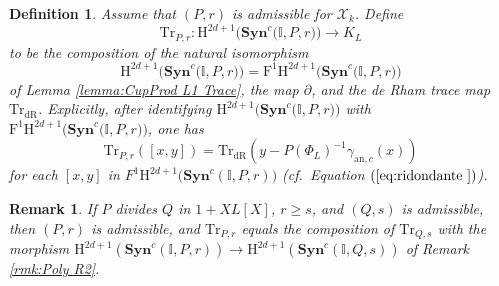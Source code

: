 \documentclass[asterisque,english]{smfart}
\newtheorem{definition}{Definition}[]
\newtheorem{remark}[theo]{Remark}
\newcommand{\Q}{\mathbf{Q}}
\newcommand{\ges}{\geqslant}
\begin{document}
\begin{definition}
\label{def:CupProd F Trace} Assume that $\left( P,r\right) $ is admissible
for $\mathcal{X}_{k}$. Define 
\[
\mathrm{Tr}_{P,r}\colon \mathrm{H}^{2d+1}\big( \mathbf{Syn}^{c}\big( 
\mathbb{I},P,r\big) \big) \longrightarrow K_{L}
\]%
to be the composition of the natural isomorphism $$\mathrm{H}^{2d+1}\big( \mathbf{Syn}%
^{c}\big( \mathbb{I},P,r\big) \big) =\mathrm{F}^{1}\mathrm{H}%
^{2d+1}\big( \mathbf{Syn}^{c}\big( \mathbb{I},P,r\big) \big)$$ of
Lemma \ref{lemma:CupProd L1 Trace}, the map $\partial$, and the de Rham trace map $\mathrm{Tr}_{\mathrm{dR}}$. Explicitly, after identifying 
$\mathrm{H}^{2d+1}\big( \mathbf{Syn}^{c}\big( \mathbb{I},P,r\big)\big)$ with $\mathrm{F}^{1}\mathrm{H}^{2d+1}\big( \mathbf{Syn}^{c}\big( \mathbb{I},P,r\big) \big)$, one has 
\[
     \mathrm{Tr}_{P,r}([x,y])=\mathrm{Tr}_{\mathrm{dR}}\left( y-P\left( \Phi _{L}\right)
^{-1}\gamma _{\mathrm{an},c}\left( x\right) \right)
\]
for each $[x,y]$ in $F^{1}\mathrm{H}^{2d+1}\big(\mathbf{Syn}^{c}\left( \mathbb{I},P,r\right)\big)$ (cf.\ Equation $(\ref{eq:ridondante })$).
\end{definition}

\begin{remark}
If $P$ divides $Q$ in $1+XL[X]$, $r\ges s$, and $\left( Q,s\right) $ is admissible, then $(P,r)$ is admissible, and $\mathrm{Tr}_{P,r}$
equals the composition of $\mathrm{Tr}_{Q,s}$ with the morphism $\mathrm{H}^{2d+1}\left( 
 \mathbf{Syn
}^{c}\left( \mathbb{I},P,r\right) \right) \longrightarrow \mathrm{H}^{2d+1}\left(  \mathbf{Syn
}^{c}\left( \mathbb{I},Q,s\right)\right) $ of Remark \ref{rmk:Poly R2}.

\end{remark}

%
\end{document}
